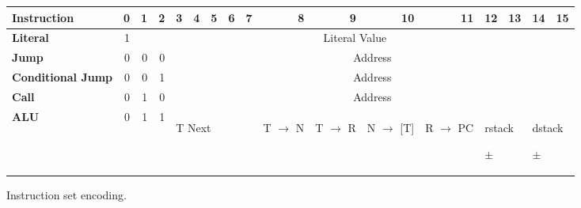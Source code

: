 \documentclass	[a4paper, 10pt]	{article}
\begin{document}
\begin{centering}
  \begin{figure}[bp]
\hspace*{-1cm}
    \begin{tabular}{|l|r|r|r|l|l|l|l|l|l|l|l|l|l|l|l|l|}
      \hline
      \textbf{Instruction} & 0 & 1 & 2 & \multicolumn{1}{r|}{3} & \multicolumn{1}{r|}{4} & \multicolumn{1}{r|}{5} & \multicolumn{1}{r|}{6} & \multicolumn{1}{r|}{7} & \multicolumn{1}{r|}{8} & \multicolumn{1}{r|}{9} & \multicolumn{1}{r|}{10} & \multicolumn{1}{r|}{11} & \multicolumn{1}{r|}{12} & \multicolumn{1}{r|}{13} & \multicolumn{1}{r|}{14} & \multicolumn{1}{r|}{15} \\ \hline
      \textbf{Literal} & 1 & \multicolumn{ 15}{c|}{Literal Value} \\ \hline
      \textbf{Jump} & 0 & 0 & 0 & \multicolumn{ 13}{c|}{Address} \\ \hline
      \textbf{Conditional Jump} & 0 & 0 & 1 & \multicolumn{ 13}{c|}{Address} \\ \hline
      \textbf{Call} & 0 & 1 & 0 & \multicolumn{ 13}{c|}{Address} \\ \hline
      \textbf{ALU}  & 0 & 1 & 1 & \multicolumn{ 5}{l|}{\hspace{1.2cm}\begin{sideways}T Next\end{sideways}} & \begin{sideways}T $\to$ N\end{sideways} & \begin{sideways}T $\to$ R \end{sideways}& \begin{sideways}N $\to$ [T] \end{sideways}& \begin{sideways}R $\to$ PC\end{sideways} & \multicolumn{ 2}{l|}{\hspace{0.3cm}\begin{sideways}rstack\end{sideways} \begin{sideways}$\pm$\end{sideways}} & \multicolumn{ 2}{l|}{\hspace{0.3cm}\begin{sideways}dstack\end{sideways}\begin{sideways}$\pm$\end{sideways}} \\ \hline
    \end{tabular}
    \caption{Instruction set encoding.}
    \label{fig:Instruction set encoding.}
  \end{figure}
\end{centering}
\FloatBarrier
\end{document}
